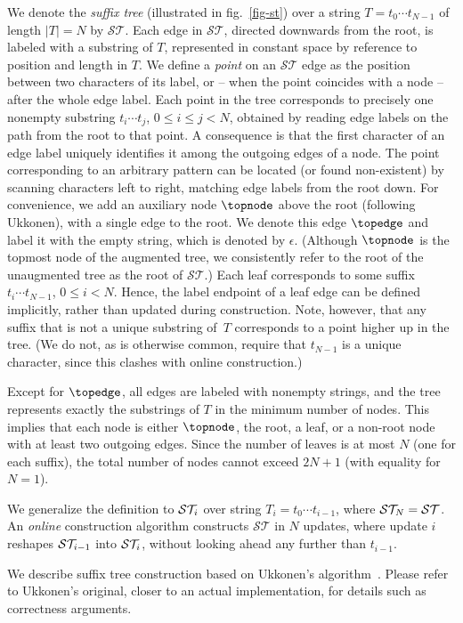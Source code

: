 \documentclass{llncs}
\newcommand\emptystring{{\epsilon}}
\newcommand\ST{{\mathcal{ST}}}
\newcommand\STi[1]{{\mathcal{ST}_{\kern-.222em #1}}}
\begin{document}
We denote the \emph{suffix tree} (illustrated in fig.~\ref{fig-st}) over a
string $T=t_0\cdots t_{N-1}$ of length $|T|=N$ by $\ST$\!. Each edge in
$\ST$\!, directed downwards from the root, is labeled with a substring of
$T$\!, represented in constant space by reference to position and length in
$T$\!. We define a \emph{point} on an $\ST$ edge as the position between two
characters of its label, or -- when the point coincides with a node -- after
the whole edge label. Each point in the tree corresponds to precisely one
nonempty substring $t_i\cdots t_j$, $0\le i\leq j<N$, obtained by reading edge
labels on the path from the root to that point. A consequence is that the first
character of an edge label uniquely identifies it among the outgoing edges of a
node. The point corresponding to an arbitrary pattern can be located (or found
non-existent) by scanning characters left to right, matching edge labels from
the root down.  For convenience, we add an auxiliary node $\topnode$ above the
root (following Ukkonen), with a single edge to the root. We denote this edge
$\topedge$ and label it with the empty string, which is denoted by
$\emptystring$. (Although $\topnode$ is the topmost node of the augmented tree,
we consistently refer to the root of the unaugmented tree as the root of
$\ST$\!.) Each leaf corresponds to some suffix~$t_i\cdots t_{N-1}$, $0\le
i<N$. Hence, the label endpoint of a leaf edge can be defined implicitly,
rather than updated during construction. Note, however, that any suffix that is
not a unique substring of~$T$ corresponds to a point higher up in the tree. (We
do not, as is otherwise common, require that $t_{N-1}$ is a unique character,
since this clashes with online construction.)

Except for $\topedge$, all edges are labeled with nonempty strings,
and the tree represents exactly the substrings of $T$ in the minimum number of
nodes. This implies that each node is either $\topnode$, the root, a leaf, or a
non-root node with at least two outgoing edges. Since the number of leaves is
at most $N$ (one for each suffix), the total number of nodes cannot exceed
$2N+1$ (with equality for $N=1$).



We generalize the definition to $\STi{i}$ over string $T_i=t_0 \cdots
t_{i-1}$, where $\STi{N}=\ST$. An \emph{online} construction algorithm
constructs $\ST$ in $N$ updates, where update $i$ reshapes
$\STi{i-1}$ into $\STi{i}$, without looking ahead any further than $t_{i-1}$.


We describe suffix tree construction based on Ukkonen's algorithm~\cite{UkkoOnli}. Please refer to Ukkonen's original,
closer to an actual implementation, for details such as
correctness arguments.
\end{document}
